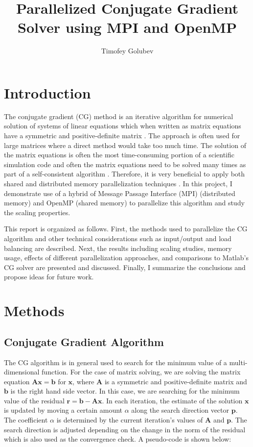 \documentclass{article}
\begin{document}
\title{Parallelized Conjugate Gradient Solver using MPI and OpenMP }
\author{Timofey Golubev}
\maketitle


\section{Introduction} 
The conjugate gradient (CG) method is an iterative algorithm for numerical solution of systems of linear equations which when written as matrix equations have a symmetric and positive-definite matrix \cite{Golub}. The approach is often used for large matrices where a direct method would take too much time. The solution of the matrix equations is often the most time-consuming portion of a scientific simulation code and often the matrix equations need to be solved many times as part of a self-consistent algorithm \cite{Gummel, Gift}. Therefore, it is very beneficial to apply both shared and distributed memory parallelization techniques \cite{openmp_mpi_paper, mpi_openmp_2}. In this project, I demonstrate use of a hybrid of Message Passage Interface (MPI) (distributed memory) and OpenMP (shared memory) to parallelize this algorithm and study the scaling properties. 

This report is organized as follows. First, the methods used to parallelize the CG algorithm and other technical considerations such as input/output and load balancing are described.  Next, the results including scaling studies, memory usage, effects of different parallelization approaches, and comparisons to Matlab's CG solver are presented and discussed. Finally, I summarize the conclusions and propose ideas for future work.

\section{Methods}

\subsection{Conjugate Gradient Algorithm}
The CG algorithm is in general used to search for the minimum value of a multi-dimensional function. For the case of matrix solving, we are solving the matrix equation $\mathbf{Ax} = \mathbf{b}$ for $\mathbf{x}$, where $\mathbf{A}$ is a symmetric and positive-definite matrix and $\mathbf{b}$ is the right hand side vector. In this case, we are searching for the minimum value of the residual $\mathbf{r} = \mathbf{b} - \mathbf{Ax}$. In each iteration, the estimate of the solution $\mathbf{x}$ is updated by moving a certain amount $\alpha$ along the search direction vector $\mathbf{p}$. The coefficient $\alpha$ is determined by the current iteration's values of $\mathbf{A}$ and $\mathbf{p}$. The search direction is adjusted depending on the change in the norm of the residual which is also used as the convergence check. A pseudo-code is shown below:
\end{document}
